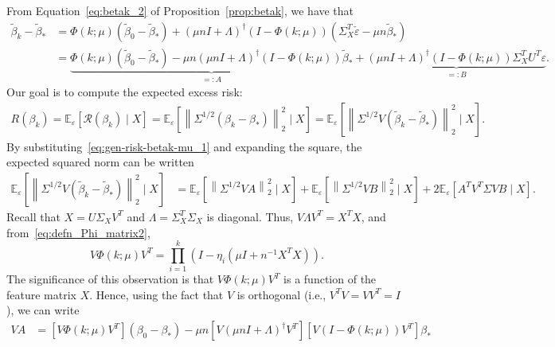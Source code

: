 \documentclass[11pt]{article}
\newenvironment{proof*}
  {\par\pushQED{\qed}\normalfont\ignorespaces}
  {\popQED\par}
\begin{document}
\begin{proof*}
From Equation~\eqref{eq:betak_2} of Proposition~\ref{prop:betak}, we have that
\begin{align} 
    \tilde{\beta}_k - \tilde{\beta}_*
    &= \Phi(k; \mu)(\tilde{\beta}_0 - \tilde{\beta}_*) + (\mu n I + \Lambda)^{\dagger}(I - \Phi(k; \mu))(\Sigma_X^T \check{\varepsilon} - \mu n \tilde{\beta}_*) \nonumber\\
    &= \underbrace{\Phi(k; \mu)(\tilde{\beta}_0 - \tilde{\beta}_*) - \mu n (\mu n I + \Lambda)^{\dagger}  (I - \Phi(k; \mu)) \tilde{\beta}_*}_{=: A} + \underbrace{(\mu n I + \Lambda)^{\dagger} (I - \Phi(k; \mu)) \Sigma_X^T U^T \varepsilon}_{=: B}. \label{eq:gen-risk-betak-mu_1}
\end{align}
Our goal is to compute the expected excess risk:
\begin{align*}
    R(\beta_k)
    = \mathbb{E}_\varepsilon[\mathcal{R}(\beta_k) \mid X]
    = \mathbb{E}_\varepsilon \left[ \left\| \Sigma^{1/2} (\beta_k - \beta_*) \right\|_2^2 \mid X \right]
    = \mathbb{E}_\varepsilon \left[ \left\| \Sigma^{1/2} V \left( \tilde{\beta}_k - \tilde{\beta}_* \right) \right\|_2^2 \mid X \right].
\end{align*}
By substituting~\eqref{eq:gen-risk-betak-mu_1} and expanding the square, the expected squared norm can be written
\begin{equation} \label{eq:gen-risk-betak-mu_2}
\begin{aligned}
    \mathbb{E}_\varepsilon \left[ \left\| \Sigma^{1/2} V (\tilde{\beta}_k - \tilde{\beta}_*) \right\|_2^2 \mid X \right]
    &= \mathbb{E}_{\varepsilon} \left[ \left\| \Sigma^{1/2} V A \right\|_2^2 \mid X \right]
    + \mathbb{E}_\varepsilon \left[ \left\| \Sigma^{1/2} V B \right\|_2^2 \mid X \right]
    + 2 \mathbb{E}_\varepsilon \left[ A^T V^T \Sigma V B \mid X \right].
\end{aligned}
\end{equation}
Recall that $X = U \Sigma_X V^T$ and $\Lambda = \Sigma_X^T \Sigma_X$ is diagonal. Thus, $V \Lambda V^T = X^T X$, and from~\eqref{eq:defn_Phi_matrix2},
\[
    V \Phi(k; \mu) V^T = \prod_{i=1}^k (I - \eta_i (\mu I + n^{-1} X^T X)).
\]
The significance of this observation is that $V \Phi(k; \mu) V^T$ is a function of the feature matrix $X$. Hence, using the fact that $V$ is orthogonal (i.e., $V^T V = V V^T = I$), we can write
\begin{align}
    V A &= [V \Phi(k; \mu) V^T] (\beta_0 - \beta_*) - \mu n [V (\mu n I + \Lambda)^{\dagger} V^T] [V (I - \Phi(k; \mu)) V^T] \beta_* \nonumber \\

\end{align}
\end{proof*}
\end{document}
